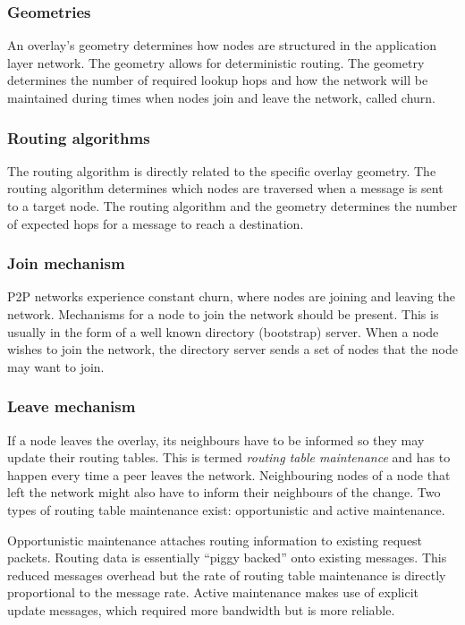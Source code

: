 \subsubsection{Geometries}

An overlay's geometry determines how nodes are structured in the application layer network. The geometry allows for deterministic routing. The geometry determines the number of required lookup hops and how the network will be maintained during times when nodes join and leave the network, called churn.

\subsubsection{Routing algorithms}

The routing algorithm is directly related to the specific overlay geometry. The routing algorithm determines which nodes are traversed when a message is sent to a target node. The routing algorithm and the geometry determines the number of expected hops for a message to reach a destination.

\subsubsection{Join mechanism}

P2P networks experience constant churn, where nodes are joining and leaving the network. Mechanisms for a node to join the network should be present. This is usually in the form of a well known directory (bootstrap) server. When a node wishes to join the network, the directory server sends a set of nodes that the node may want to join.

\subsubsection{Leave mechanism}

If a node leaves the overlay, its neighbours have to be informed so they may update their routing tables. This is termed \emph{routing table maintenance} and has to happen every time a peer leaves the network. Neighbouring nodes of a node that left the network might also have to inform their neighbours of the change. Two types of routing table maintenance exist: opportunistic and active maintenance.

Opportunistic maintenance attaches routing information to existing request packets. Routing data is essentially ``piggy backed'' onto existing messages. This reduced messages overhead but the rate of routing table maintenance is directly proportional to the message rate. Active maintenance makes use of explicit update messages, which required more bandwidth but is more reliable.


